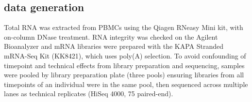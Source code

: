\subsection{ data generation}

Total RNA was extracted from \glspl{PBMC} using the Qiagen RNeasy Mini kit, with on-column DNase treatment.
RNA integrity was checked on the Agilent Bioanalyzer and mRNA libraries were prepared with the KAPA Stranded mRNA-Seq Kit (KK8421), which uses poly(A) selection.
To avoid confounding of timepoint and technical effects from library preparation and sequencing,
samples were pooled by library preparation plate (three pools) ensuring libraries from all timepoints of an individual were in the same pool, 
then sequenced across multiple lanes as technical replicates (HiSeq 4000, \SI{75}{\bp} paired-end).
%

